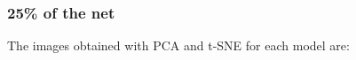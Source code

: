\documentclass[12pt]{article} %
\begin{document}
\subsubsection {25\%  of the net}
The images obtained with PCA and t-SNE for each model are:\\

\begin{minipage}{0.5\textwidth}
\begin{figure}[H] %
 \end{figure}
\end{minipage}
\begin{minipage}{0.5\textwidth}
\begin{figure}[H] %
 \end{figure}
\end{minipage}
\end{document}
